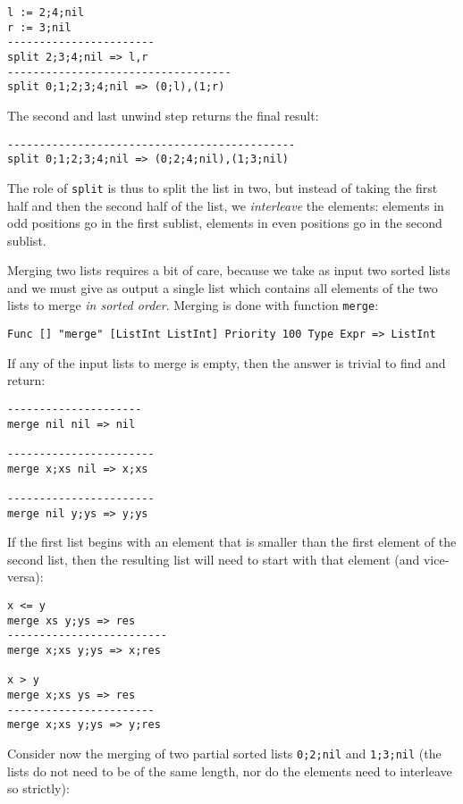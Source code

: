\begin{lstlisting}
l := 2;4;nil
r := 3;nil
-----------------------
split 2;3;4;nil => l,r
-----------------------------------
split 0;1;2;3;4;nil => (0;l),(1;r)
\end{lstlisting}

The second and last unwind step returns the final result:

\begin{lstlisting}
---------------------------------------------
split 0;1;2;3;4;nil => (0;2;4;nil),(1;3;nil)
\end{lstlisting}

The role of \texttt{split} is thus to split the list in two, but instead of taking the first half and then the second half of the list, we \textit{interleave} the elements: elements in odd positions go in the first sublist, elements in even positions go in the second sublist.

Merging two lists requires a bit of care, because we take as input two sorted lists and we must give as output a single list which contains all elements of the two lists to merge \textit{in sorted order}. Merging is done with function \texttt{merge}:

\begin{lstlisting}
Func [] "merge" [ListInt ListInt] Priority 100 Type Expr => ListInt
\end{lstlisting}

If any of the input lists to merge is empty, then the answer is trivial to find and return:

\begin{lstlisting}
---------------------
merge nil nil => nil

-----------------------
merge x;xs nil => x;xs

-----------------------
merge nil y;ys => y;ys
\end{lstlisting}

If the first list begins with an element that is smaller than the first element of the second list, then the resulting list will need to start with that element (and vice-versa):

\begin{lstlisting}
x <= y
merge xs y;ys => res
-------------------------
merge x;xs y;ys => x;res

x > y
merge x;xs ys => res
-----------------------
merge x;xs y;ys => y;res
\end{lstlisting}

Consider now the merging of two partial sorted lists \texttt{0;2;nil} and \texttt{1;3;nil} (the lists do not need to be of the same length, nor do the elements need to interleave so strictly):

